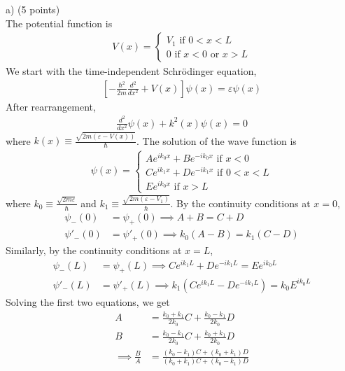\documentclass[12pt]{book} %
\numberwithin{equation}{chapter}
\def\e{\varepsilon}
\begin{document}
\begin{solbox}
a) (5 points)\\
The potential function is
\begin{align*}
V(x)=
\begin{cases}
V_{1}\text{ if }0<x<L\\
0\text{ if }x<0\text{ or }x>L
\end{cases}
\end{align*}
We start with the time-independent Schr\"{o}dinger equation,
\begin{align*}
\left[-\frac{\hbar^{2}}{2m}\frac{d^{2}}{dx^{2}}+V(x)\right]\psi(x)=\e\psi(x)
\end{align*}
After rearrangement,
\begin{align*}
\frac{d^{2}}{dx^{2}}\psi(x)+k^{2}(x)\psi(x)=0
\end{align*}
where $k(x)\equiv\frac{\sqrt{2m(\e-V(x))}}{\hbar}$.\bigskip\newline
The solution of the wave function is
\begin{align*}
\psi(x)=
\begin{cases}
Ae^{ik_{0}x}+Be^{-ik_{0}x}\text{ if }x<0\\
Ce^{ik_{1}x}+De^{-ik_{1}x}\text{ if }0<x<L\\
Ee^{ik_{0}x}\text{ if }x>L
\end{cases}
\end{align*}
where $k_{0}\equiv\frac{\sqrt{2m\e}}{\hbar}$ and $k_{1}\equiv\frac{\sqrt{2m(\e-V_{1})}}{\hbar}$.\bigskip\newline
By the continuity conditions at $x=0$,
\begin{align*}
\psi_{-}(0)&=\psi_{+}(0)\implies A+B=C+D\\
\psi'_{-}(0)&=\psi'_{+}(0)\implies k_{0}(A-B)=k_{1}(C-D)
\end{align*}
Similarly, by the continuity conditions at $x=L$,
\begin{align*}
\psi_{-}(L)&=\psi_{+}(L)\implies Ce^{ik_{1}L}+De^{-ik_{1}L}=Ee^{ik_{0}L}\\
\psi'_{-}(L)&=\psi'_{+}(L)\implies k_{1}\left(Ce^{ik_{1}L}-De^{-ik_{1}L}\right)=k_{0}E^{ik_{0}L}
\end{align*}
Solving the first two equations, we get
\begin{align*}
A&=\frac{k_{0}+k_{1}}{2k_{0}}C+\frac{k_{0}-k_{1}}{2k_{0}}D\\
B&=\frac{k_{0}-k_{1}}{2k_{0}}C+\frac{k_{0}+k_{1}}{2k_{0}}D\\
\implies \frac{B}{A}&=\frac{(k_{0}-k_{1})C+(k_{0}+k_{1})D}{(k_{0}+k_{1})C+(k_{0}-k_{1})D}

\end{align*}
\end{solbox}
\end{document}
